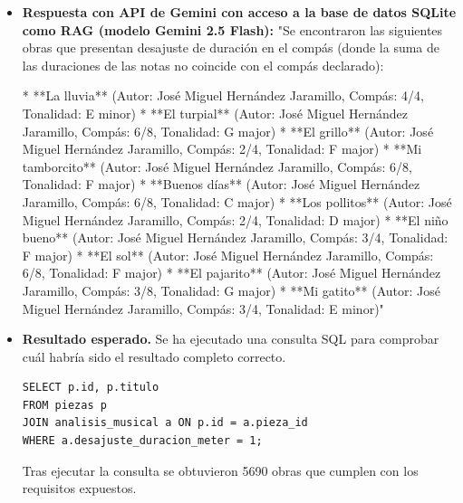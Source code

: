 \begin{itemize}
Para verificar si hay algún problema concreto, te recomiendo:

1. Verificar cada staffDef individualmente para asegurarte de que el tempo declarado sea correcto.
2. Comprobar que no haya indicadores de duración adicionales (dots, ties) que estén aumentando la duración de las notas.
3. Revisar la codificación del XML para asegurarte de que no haya errores.

Si sigues encontrando problemas, te sugiero compartir más detalles sobre las obras específicas que están presentando este problema y podré ayudarte a investigar más a fondo."
\item \textbf{Respuesta con API de Gemini con acceso a la base de datos SQLite como RAG (modelo Gemini 2.5 Flash):} "Se encontraron las siguientes obras que presentan desajuste de duración en el compás (donde la suma de las duraciones de las notas no coincide con el compás declarado):

*   **La lluvia** (Autor: José Miguel Hernández Jaramillo, Compás: 4/4, Tonalidad: E minor)
*   **El turpial** (Autor: José Miguel Hernández Jaramillo, Compás: 6/8, Tonalidad: G major)
*   **El grillo** (Autor: José Miguel Hernández Jaramillo, Compás: 2/4, Tonalidad: F major)
*   **Mi tamborcito** (Autor: José Miguel Hernández Jaramillo, Compás: 6/8, Tonalidad: F major)
*   **Buenos días** (Autor: José Miguel Hernández Jaramillo, Compás: 6/8, Tonalidad: C major)
*   **Los pollitos** (Autor: José Miguel Hernández Jaramillo, Compás: 2/4, Tonalidad: D major)
*   **El niño bueno** (Autor: José Miguel Hernández Jaramillo, Compás: 3/4, Tonalidad: F major)
*   **El sol** (Autor: José Miguel Hernández Jaramillo, Compás: 6/8, Tonalidad: F major)
*   **El pajarito** (Autor: José Miguel Hernández Jaramillo, Compás: 3/8, Tonalidad: G major)
*   **Mi gatito** (Autor: José Miguel Hernández Jaramillo, Compás: 3/4, Tonalidad: E minor)"
\item \textbf{Resultado esperado.} Se ha ejecutado una consulta SQL para comprobar cuál habría sido el resultado completo correcto.
    \begin{verbatim}
SELECT p.id, p.titulo
FROM piezas p
JOIN analisis_musical a ON p.id = a.pieza_id
WHERE a.desajuste_duracion_meter = 1;
    \end{verbatim}    
    Tras ejecutar la consulta se obtuvieron 5690 obras que cumplen con los requisitos expuestos.


\end{itemize}
